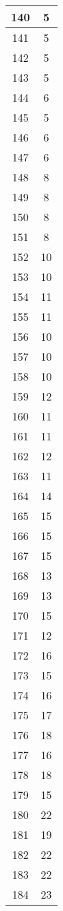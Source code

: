 \documentclass[letterpaper, 12pt]{article}
\begin{document}
\begin{longtable}{|c|c|}
\hline
140 & 5 \\
\hline
141 & 5 \\
\hline
142 & 5 \\
\hline
143 & 5 \\
\hline
144 & 6 \\
\hline
145 & 5 \\
\hline
146 & 6 \\
\hline
147 & 6 \\
\hline
148 & 8 \\
\hline
149 & 8 \\
\hline
150 & 8 \\
\hline
151 & 8 \\
\hline
152 & 10 \\
\hline
153 & 10 \\
\hline
154 & 11 \\
\hline
155 & 11 \\
\hline
156 & 10 \\
\hline
157 & 10 \\
\hline
158 & 10 \\
\hline
159 & 12 \\
\hline
160 & 11 \\
\hline
161 & 11 \\
\hline
162 & 12 \\
\hline
163 & 11 \\
\hline
164 & 14 \\
\hline
165 & 15 \\
\hline
166 & 15 \\
\hline
167 & 15 \\
\hline
168 & 13 \\
\hline
169 & 13 \\
\hline
170 & 15 \\
\hline
171 & 12 \\
\hline
172 & 16 \\
\hline
173 & 15 \\
\hline
174 & 16 \\
\hline
175 & 17 \\
\hline
176 & 18 \\
\hline
177 & 16 \\
\hline
178 & 18 \\
\hline
179 & 15 \\
\hline
180 & 22 \\
\hline
181 & 19 \\
\hline
182 & 22 \\
\hline
183 & 22 \\
\hline
184 & 23 \\

\end{longtable}
\end{document}
